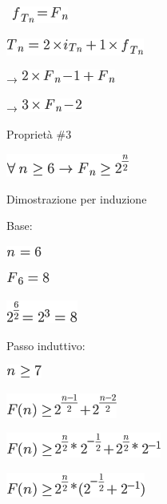 \documentclass{article}
\begin{document}
{~}\includegraphics{images/image53.png}

\includegraphics{images/image54.png}

{→ }\includegraphics{images/image55.png}

{→ }\includegraphics{images/image56.png}{~}

{Proprietà \#3}

\includegraphics{images/image57.png}

{Dimostrazione per induzione}

{Base:}

\includegraphics{images/image58.png}

\includegraphics{images/image59.png}

\includegraphics{images/image60.png}

{Passo induttivo:}

\includegraphics{images/image61.png}

\includegraphics{images/image62.png}

\includegraphics{images/image63.png}

\includegraphics{images/image64.png}
\end{document}
